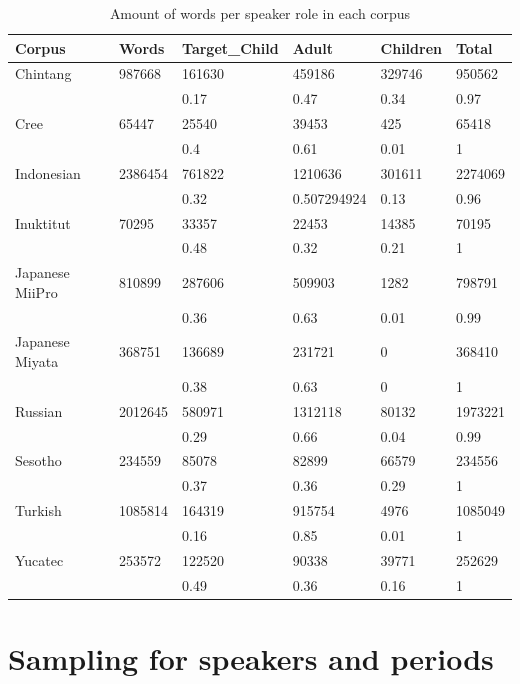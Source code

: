 \documentclass[a4paper, 11pt]{book}
\begin{document}
\begin{table}[ht!]
	\centering
	\begin{tabular}{llllll}
		\toprule
Corpus	&	Words	&	Target\_Child	&	Adult	&	Children &	Total	\\
		\midrule
Chintang	&	987668	&	161630	&	459186	&	329746	&	950562	\\
	&		&	0.17	&	0.47	&	0.34	&	0.97	\\
\hline		
Cree	&	65447	&	25540	&	39453	&	425	&	65418	\\
	&		&	0.4	&	0.61	&	0.01	&	1	\\
\hline		
Indonesian	&	2386454	&	761822	&	1210636	&	301611	&	2274069	\\
	&		&	0.32	&	0.507294924	&	0.13	&	0.96	\\
\hline		
Inuktitut	&	70295	&	33357	&	22453	&	14385	&	70195	\\
	&		&	0.48	&	0.32	&	0.21	&	1	\\
\hline		
Japanese MiiPro	&	810899	&	287606	&	509903	&	1282	&	798791	\\
	&		&	0.36	&	0.63	&	0.01	&	0.99	\\
\hline		
Japanese Miyata	&	368751	&	136689	&	231721	&	0	&	368410	\\
	&		&	0.38	&	0.63	&	0	&	1	\\
\hline		
Russian	&	2012645	&	580971	&	1312118	&	80132	&	1973221	\\
	&		&	0.29	&	0.66	&	0.04	&	0.99	\\
\hline		
Sesotho	&	234559	&	85078	&	82899	&	66579	&	234556	\\
	&		&	0.37	&	0.36	&	0.29	&	1	\\
\hline		
Turkish	&	1085814	&	164319	&	915754	&	4976	&	1085049	\\
	&		&	0.16	&	0.85	&	0.01	&	1	\\
\hline		
Yucatec	&	253572	&	122520	&	90338	&	39771	&	252629	\\
	&		&	0.49	&	0.36	&	0.16	&	1	\\
		\bottomrule
	\end{tabular}
	\caption{Amount of words per speaker role in each corpus}
	\label{tab:Amount of words per speaker role in each corpus}
\end{table}


\section{Sampling for speakers and periods}
\label{sec:Sampling for speakers and periods}
\end{document}
